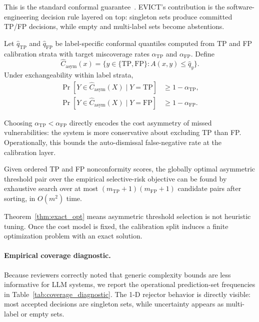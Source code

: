 This is the standard conformal guarantee~\cite{vovk2005}. EVICT's contribution is the software-engineering decision rule layered on top: singleton sets produce committed TP/FP decisions, while empty and multi-label sets become abstentions.

\begin{theorem}
\label{thm:label_conditional}
Let $\hat q_{\mathrm{TP}}$ and $\hat q_{\mathrm{FP}}$ be label-specific conformal quantiles computed from TP and FP calibration strata with target miscoverage rates $\alpha_{\mathrm{TP}}$ and $\alpha_{\mathrm{FP}}$. Define
\[
\hat C_{\mathrm{asym}}(x)=\{y\in\{\mathrm{TP},\mathrm{FP}\}: A(x,y)\le \hat q_y\}.
\]
Under exchangeability within label strata,
\begin{align}
\Pr[Y\in\hat C_{\mathrm{asym}}(X)\mid Y=\mathrm{TP}]&\ge 1-\alpha_{\mathrm{TP}},\\
\Pr[Y\in\hat C_{\mathrm{asym}}(X)\mid Y=\mathrm{FP}]&\ge 1-\alpha_{\mathrm{FP}}.
\end{align}
\end{theorem}

Choosing $\alpha_{\mathrm{TP}}<\alpha_{\mathrm{FP}}$ directly encodes the cost asymmetry of missed vulnerabilities: the system is more conservative about excluding TP than FP. Operationally, this bounds the auto-dismissal false-negative rate at the calibration layer.

\begin{theorem}
\label{thm:exact_opt}
Given ordered TP and FP nonconformity scores, the globally optimal asymmetric threshold pair over the empirical selective-risk objective can be found by exhaustive search over at most $(m_{\mathrm{TP}}+1)(m_{\mathrm{FP}}+1)$ candidate pairs after sorting, in $O(m^2)$ time.
\end{theorem}

Theorem~\ref{thm:exact_opt} means asymmetric threshold selection is not heuristic tuning. Once the cost model is fixed, the calibration split induces a finite optimization problem with an exact solution.

\paragraph{Empirical coverage diagnostic.}
Because reviewers correctly noted that generic complexity bounds are less informative for LLM systems, we report the operational prediction-set frequencies in Table~\ref{tab:coverage_diagnostic}. The 1-D rejector behavior is directly visible: most accepted decisions are singleton sets, while uncertainty appears as multi-label or empty sets.

